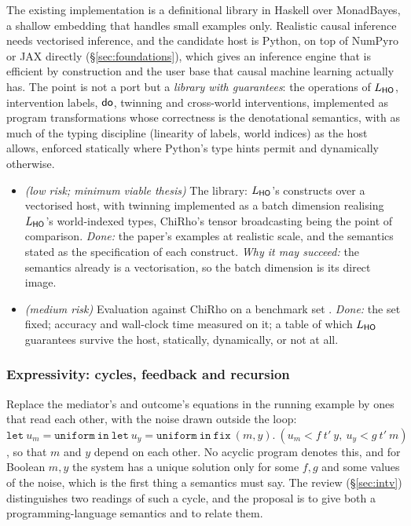 The existing implementation is a definitional library in Haskell over MonadBayes, a shallow embedding that handles small examples only. Realistic causal inference needs vectorised inference, and the candidate host is Python, on top of NumPyro or JAX directly (\S\ref{sec:foundations}), which gives an inference engine that is efficient by construction and the user base that causal machine learning actually has. The point is not a port but a \emph{library with guarantees}: the operations of $L_{\mathsf{HO}}$, intervention labels, $\mathsf{do}$, twinning and cross-world interventions, implemented as program transformations whose correctness is the denotational semantics, with as much of the typing discipline (linearity of labels, world indices) as the host allows, enforced statically where Python's type hints permit and dynamically otherwise.
\begin{itemize}[nosep]
\item[A1] \textit{(low risk; minimum viable thesis)} The library: $L_{\mathsf{HO}}$'s constructs over a vectorised host, with twinning implemented as a batch dimension realising $L_{\mathsf{HO}}$'s world-indexed types, ChiRho's tensor broadcasting being the point of comparison. \emph{Done:} the paper's examples at realistic scale, and the semantics stated as the specification of each construct. \emph{Why it may succeed:} the semantics already is a vectorisation, so the batch dimension is its direct image.
\item[A2] \textit{(medium risk)} Evaluation against ChiRho on a benchmark set . \emph{Done:} the set fixed; accuracy and wall-clock time measured on it; a table of which $L_{\mathsf{HO}}$ guarantees survive the host, statically, dynamically, or not at all.
\end{itemize}

\subsubsection{Expressivity: cycles, feedback and recursion}\label{sec:prop-expressivity}

Replace the mediator's and outcome's equations in the running example by ones that read each other, with the noise drawn outside the loop: $\mathtt{let}\ u_m = \mathtt{uniform}\ \mathtt{in}\ \mathtt{let}\ u_y = \mathtt{uniform}\ \mathtt{in}\ \mathtt{fix}\ (m,y).\ (u_m < f\ t'\ y,\ u_y < g\ t'\ m)$, so that $m$ and $y$ depend on each other. No acyclic program denotes this, and for Boolean $m, y$ the system has a unique solution only for some $f, g$ and some values of the noise, which is the first thing a semantics must say. The review (\S\ref{sec:intv}) distinguishes two readings of such a cycle, and the proposal is to give both a programming-language semantics and to relate them.

